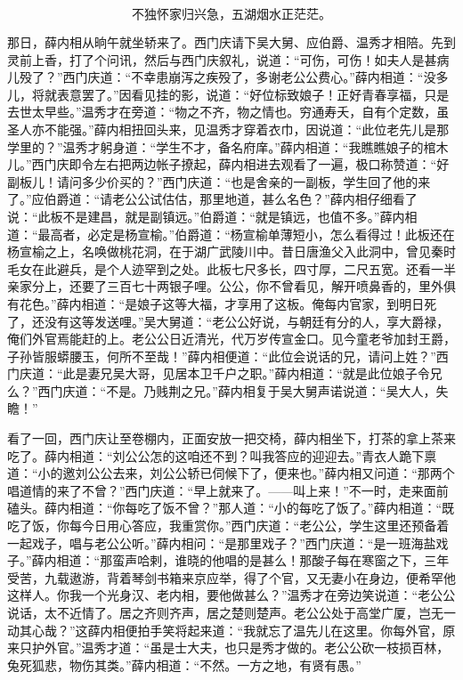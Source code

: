 \[
不独怀家归兴急，五湖烟水正茫茫。
\]

那日，薛内相从晌午就坐轿来了。西门庆请下吴大舅、应伯爵、温秀才相陪。先到灵前上香，打了个问讯，然后与西门庆叙礼，说道：“可伤，可伤！如夫人是甚病儿殁了？”西门庆道：“不幸患崩泻之疾殁了，多谢老公公费心。”薛内相道：“没多儿，将就表意罢了。”因看见挂的影，说道：“好位标致娘子！正好青春享福，只是去世太早些。”温秀才在旁道：“物之不齐，物之情也。穷通寿夭，自有个定数，虽圣人亦不能强。”薛内相扭回头来，见温秀才穿着衣巾，因说道：“此位老先儿是那学里的？”温秀才躬身道：“学生不才，备名府庠。”薛内相道：“我瞧瞧娘子的棺木儿。”西门庆即令左右把两边帐子撩起，薛内相进去观看了一遍，极口称赞道：“好副板儿！请问多少价买的？”西门庆道：“也是舍亲的一副板，学生回了他的来了。”应伯爵道：“请老公公试估估，那里地道，甚么名色？”薛内相仔细看了说：“此板不是建昌，就是副镇远。”伯爵道：“就是镇远，也值不多。”薛内相道：“最高者，必定是杨宣榆。”伯爵道：“杨宣榆单薄短小，怎么看得过！此板还在杨宣榆之上，名唤做桃花洞，在于湖广武陵川中。昔日唐渔父入此洞中，曾见秦时毛女在此避兵，是个人迹罕到之处。此板七尺多长，四寸厚，二尺五宽。还看一半亲家分上，还要了三百七十两银子哩。公公，你不曾看见，解开喷鼻香的，里外俱有花色。”薛内相道：“是娘子这等大福，才享用了这板。俺每内官家，到明日死了，还没有这等发送哩。”吴大舅道：“老公公好说，与朝廷有分的人，享大爵禄，俺们外官焉能赶的上。老公公日近清光，代万岁传宣金口。见今童老爷加封王爵，子孙皆服蟒腰玉，何所不至哉！”薛内相便道：“此位会说话的兄，请问上姓？”西门庆道：“此是妻兄吴大哥，见居本卫千户之职。”薛内相道：“就是此位娘子令兄么？”西门庆道：“不是。乃贱荆之兄。”薛内相复于吴大舅声诺说道：“吴大人，失瞻！”

看了一回，西门庆让至卷棚内，正面安放一把交椅，薛内相坐下，打茶的拿上茶来吃了。薛内相道：“刘公公怎的这咱还不到？叫我答应的迎迎去。”青衣人跪下禀道：“小的邀刘公公去来，刘公公轿已伺候下了，便来也。”薛内相又问道：“那两个唱道情的来了不曾？”西门庆道：“早上就来了。——叫上来！”不一时，走来面前磕头。薛内相道：“你每吃了饭不曾？”那人道：“小的每吃了饭了。”薛内相道：“既吃了饭，你每今日用心答应，我重赏你。”西门庆道：“老公公，学生这里还预备着一起戏子，唱与老公公听。”薛内相问：“是那里戏子？”西门庆道：“是一班海盐戏子。”薛内相道：“那蛮声哈剌，谁晓的他唱的是甚么！那酸子每在寒窗之下，三年受苦，九载遨游，背着琴剑书箱来京应举，得了个官，又无妻小在身边，便希罕他这样人。你我一个光身汉、老内相，要他做甚么？”温秀才在旁边笑说道：“老公公说话，太不近情了。居之齐则齐声，居之楚则楚声。老公公处于高堂广厦，岂无一动其心哉？”这薛内相便拍手笑将起来道：“我就忘了温先儿在这里。你每外官，原来只护外官。”温秀才道：“虽是士大夫，也只是秀才做的。老公公砍一枝损百林，兔死狐悲，物伤其类。”薛内相道：“不然。一方之地，有贤有愚。”

